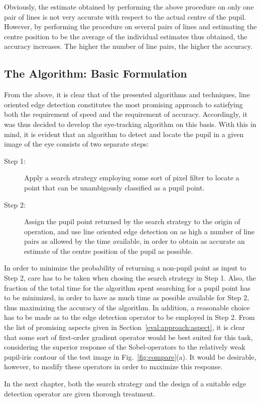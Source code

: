 Obviously, the estimate obtained by performing the above procedure on
only one pair of lines is not very accurate with respect to the actual
centre of the pupil.  However, by performing the procedure on several
pairs of lines and estimating the centre position to be the average of
the individual estimates thus obtained, the accuracy increases.  The
higher the number of line pairs, the higher the accuracy.

\subsection{The Algorithm: Basic Formulation}
\label{eval:approach:algo}

From the above, it is clear that of the presented algorithms and
techniques, line oriented edge detection constitutes the most
promising approach to satisfying both the requirement of speed and the
requirement of accuracy.  Accordingly, it was thus decided to develop
the eye-tracking algorithm on this basis.  With this in mind, it is
evident that an algorithm to detect and locate the pupil in a given
image of the eye consists of two separate steps:

\begin{description}
\item[Step 1:] Apply a search strategy employing some sort of pixel
  filter to locate a point that can be unambigously classified as a
  pupil point.
\item[Step 2:] Assign the pupil point returned by the search strategy
  to the origin of operation, and use line oriented edge detection on
  as high a number of line pairs as allowed by the time available, in
  order to obtain as accurate an estimate of the centre position of
  the pupil as possible.
\end{description}

In order to minimize the probability of returning a non-pupil point as
input to Step 2, care has to be taken when chosing the search strategy
in Step 1.  Also, the fraction of the total time for the algorithm
spent searching for a pupil point has to be minimized, in order to
have as much time as possible available for Step 2, thus maximizing
the accuracy of the algorithm.  In addition, a reasonable choice has
to be made as to the edge detection operator to be employed in Step 2.
From the list of promising aspects given in
Section~\ref{eval:approach:aspect}, it is clear that some sort of
first-order gradient operator would be best suited for this task,
considering the superior response of the Sobel-operators to the
relatively weak pupil-iris contour of the test image in
Fig.~\ref{fig:compare}(a).  It would be desirable, however, to modify
these operators in order to maximize this response.

In the next chapter, both the search strategy and the design of a
suitable edge detection operator are given thorough treatment.
